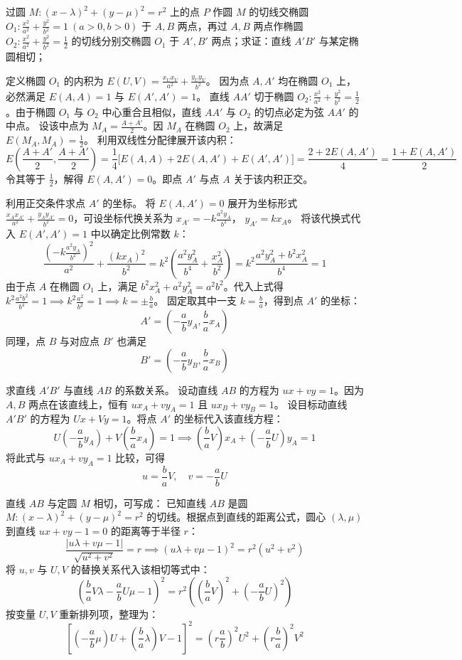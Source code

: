 \begin{exercise}
过圆 \(M: (x - \lambda)^2 + (y - \mu)^2 = r^2\) 上的点 \(P\) 作圆 \(M\) 的切线交椭圆 \(O_1: \frac{x^2}{a^2} + \frac{y^2}{b^2} = 1\ (a > 0, b > 0)\) 于 \(A,B\) 两点，再过 \(A,B\) 两点作椭圆 \(O_2: \frac{x^2}{a^2} + \frac{y^2}{b^2} = \frac{1}{2}\) 的切线分别交椭圆 \(O_1\) 于 \(A', B'\) 两点；求证：直线 \(A'B'\) 与某定椭圆相切；
\end{exercise}
\begin{solution}
定义椭圆 $O_1$ 的内积为 $E(U,V) = \frac{x_U x_V}{a^2} + \frac{y_U y_V}{b^2}$。
因为点 $A, A'$ 均在椭圆 $O_1$ 上，必然满足 $E(A,A) = 1$ 与 $E(A',A') = 1$。
直线 $AA'$ 切于椭圆 $O_2: \frac{x^2}{a^2} + \frac{y^2}{b^2} = \frac{1}{2}$。由于椭圆 $O_1$ 与 $O_2$ 中心重合且相似，直线 $AA'$ 与 $O_2$ 的切点必定为弦 $AA'$ 的中点。
设该中点为 $M_A = \frac{A+A'}{2}$。因 $M_A$ 在椭圆 $O_2$ 上，故满足 $E(M_A, M_A) = \frac{1}{2}$。
利用双线性分配律展开该内积：
$$ E\left(\frac{A+A'}{2}, \frac{A+A'}{2}\right) = \frac{1}{4} \big[ E(A,A) + 2E(A,A') + E(A',A') \big] = \frac{2 + 2E(A,A')}{4} = \frac{1 + E(A,A')}{2} $$
令其等于 $\frac{1}{2}$，解得 $E(A,A') = 0$。即点 $A'$ 与点 $A$ 关于该内积正交。

利用正交条件求点 $A'$ 的坐标。
将 $E(A,A') = 0$ 展开为坐标形式 $\frac{x_A x_{A'}}{a^2} + \frac{y_A y_{A'}}{b^2} = 0$，可设坐标代换关系为 $x_{A'} = -k \frac{a^2 y_A}{b^2}$， $y_{A'} = k x_A$。
将该代换式代入 $E(A',A') = 1$ 中以确定比例常数 $k$：
$$ \frac{\left(-k \frac{a^2 y_A}{b^2}\right)^2}{a^2} + \frac{(k x_A)^2}{b^2} = k^2 \left( \frac{a^2 y_A^2}{b^4} + \frac{x_A^2}{b^2} \right) = k^2 \frac{a^2 y_A^2 + b^2 x_A^2}{b^4} = 1 $$
由于点 $A$ 在椭圆 $O_1$ 上，满足 $b^2 x_A^2 + a^2 y_A^2 = a^2 b^2$。代入上式得 $k^2 \frac{a^2 b^2}{b^4} = 1 \implies k^2 \frac{a^2}{b^2} = 1 \implies k = \pm \frac{b}{a}$。
固定取其中一支 $k = \frac{b}{a}$，得到点 $A'$ 的坐标：
$$ A' = \left( -\frac{a}{b}y_A, \frac{b}{a}x_A \right) $$
同理，点 $B$ 与对应点 $B'$ 也满足
$$ B' = \left( -\frac{a}{b}y_B, \frac{b}{a}x_B \right) $$

求直线 $A'B'$ 与直线 $AB$ 的系数关系。
设动直线 $AB$ 的方程为 $ux + vy = 1$。因为 $A, B$ 两点在该直线上，恒有 $u x_A + v y_A = 1$ 且 $u x_B + v y_B = 1$。
设目标动直线 $A'B'$ 的方程为 $Ux + Vy = 1$。将点 $A'$ 的坐标代入该直线方程：
$$ U\left(-\frac{a}{b}y_A\right) + V\left(\frac{b}{a}x_A\right) = 1 \implies \left(\frac{b}{a}V\right)x_A + \left(-\frac{a}{b}U\right)y_A = 1 $$
将此式与 $u x_A + v y_A = 1$ 比较，可得
$$ u = \frac{b}{a}V, \quad v = -\frac{a}{b}U $$

直线 $AB$ 与定圆 $M$ 相切，可写成：
已知直线 $AB$ 是圆 $M: (x-\lambda)^2 + (y-\mu)^2 = r^2$ 的切线。根据点到直线的距离公式，圆心 $(\lambda, \mu)$ 到直线 $ux + vy - 1 = 0$ 的距离等于半径 $r$：
$$ \frac{|u\lambda + v\mu - 1|}{\sqrt{u^2 + v^2}} = r \implies (u\lambda + v\mu - 1)^2 = r^2(u^2 + v^2) $$
将 $u, v$ 与 $U, V$ 的替换关系代入该相切等式中：
$$ \left( \frac{b}{a}V\lambda - \frac{a}{b}U\mu - 1 \right)^2 = r^2 \left( \left(\frac{b}{a}V\right)^2 + \left(-\frac{a}{b}U\right)^2 \right) $$
按变量 $U, V$ 重新排列项，整理为：
$$ \left[ \left(-\frac{a}{b}\mu\right)U + \left(\frac{b}{a}\lambda\right)V - 1 \right]^2 = \left(r\frac{a}{b}\right)^2 U^2 + \left(r\frac{b}{a}\right)^2 V^2 $$


\end{solution}
